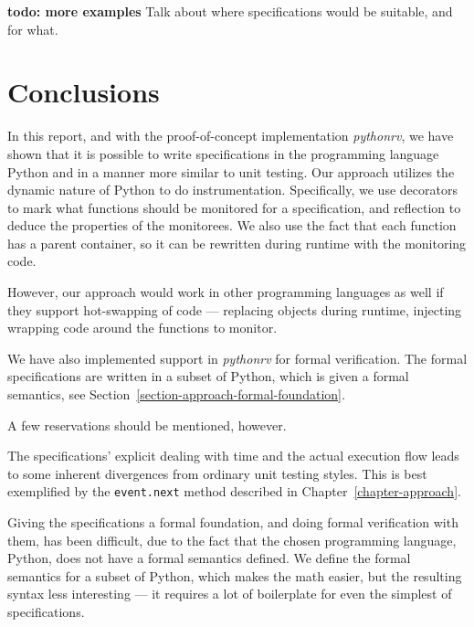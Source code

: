 \documentclass[a4paper,11pt]{kth-mag}
\theoremstyle{definition}
\newcommand{\todo}[1]{\textbf{todo: #1}}
\begin{document}
\todo{more examples}
Talk about where specifications would be suitable, and for what.






\pagestyle{newchap}
\chapter{Conclusions} \label{chapter-conclusions}

In this report, and with the proof-of-concept implementation \textit{pythonrv},
we have shown that it is possible to write specifications in the programming
language Python and in a manner more similar to unit testing. Our approach
utilizes the dynamic nature of Python to do instrumentation. Specifically, we
use decorators to mark what functions should be monitored for a specification,
and reflection to deduce the properties of the monitorees. We also use the fact
that each function has a parent container, so it can be rewritten during
runtime with the monitoring code.

However, our approach would work in other programming languages as well if they
support hot-swapping of code --- replacing objects during runtime, injecting
wrapping code around the functions to monitor.

We have also implemented support in \textit{pythonrv} for formal verification.
The formal specifications are written in a subset of Python, which is given a
formal semantics, see Section~\ref{section-approach-formal-foundation}.

A few reservations should be mentioned, however.

The specifications' explicit dealing with time and the actual
execution flow leads to some inherent divergences from ordinary unit testing
styles. This is best exemplified by the \texttt{event.next} method described in
Chapter~\ref{chapter-approach}.

Giving the specifications a formal foundation, and doing formal verification
with them, has been difficult, due to the fact that the chosen programming
language, Python, does not have a formal semantics defined. We define the
formal semantics for a subset of Python, which makes the math easier, but the
resulting syntax less interesting --- it requires a lot of boilerplate
for even the simplest of specifications.
\end{document}
